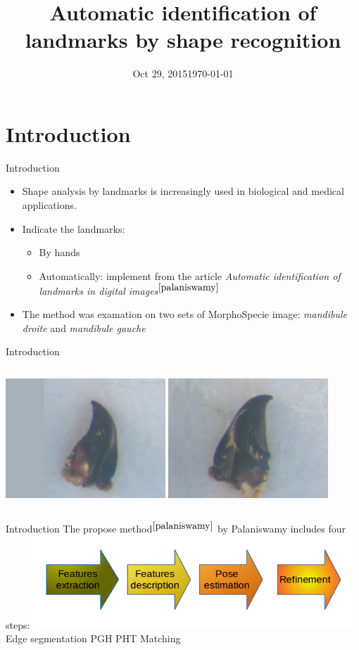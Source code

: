 \documentclass{beamer}
\title{Automatic identification of landmarks by shape recognition}
\date{Oct 29, 2015}
\date{\today}
\begin{document}
\frame{\titlepage}
\section{Introduction}
\begin{frame}{Introduction}
	\begin{itemize}
<<<<<<< HEAD
		\item Shape analysis by landmarks is increasingly used in biological and medical applications.
		\item Indicate the landmarks:
			\begin{itemize}
				\item By hands
				\item Automatically: implement from the article \textit{Automatic identification of landmarks in digital images$^{\cite{palaniswamy}}$}
			\end{itemize}			
		\item The method was examation on two sets of MorphoSpecie image: \textit{mandibule droite} and \textit{mandibule gauche}  
	\end{itemize}
\end{frame}
\begin{frame}{Introduction}
	\begin{columns}[c]
		\includegraphics[height=4.5cm]{images/model28.JPG}
		\includegraphics[height=4.5cm]{images/modelmg37.JPG}
	\end{columns}
\end{frame}
\begin{frame}{Introduction}
	The propose method$^{\cite{palaniswamy}}$ by Palaniswamy includes four steps:
	\includegraphics[height=3.5cm]{images/flow.png}
	Edge segmentation         PGH             PHT       Matching
\end{frame}
\end{document}
